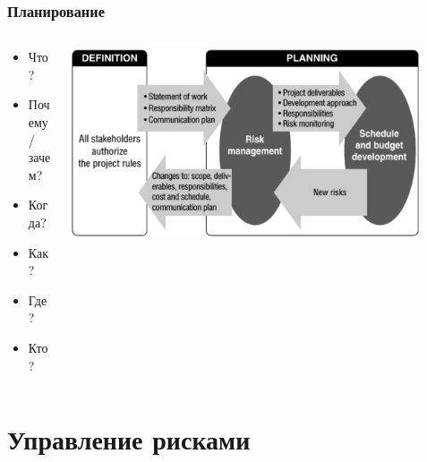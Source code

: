 \documentclass{../../slides-style}
\begin{document}
    \begin{frame}
        \frametitle{Планирование}
        \begin{columns}
            \begin{column}{0.3\textwidth}
                \begin{itemize}
                    \item Что?
                    \item Почему/зачем?
                    \item Когда?
                    \item Как?
                    \item Где?
                    \item Кто?
                \end{itemize}
            \end{column}
            \begin{column}{0.7\textwidth}
                \begin{center}
                    \includegraphics[width=0.9\textwidth]{planning.png}
                \end{center}
            \end{column}
        \end{columns}
    \end{frame}

    \section{Управление рисками}
\end{document}
